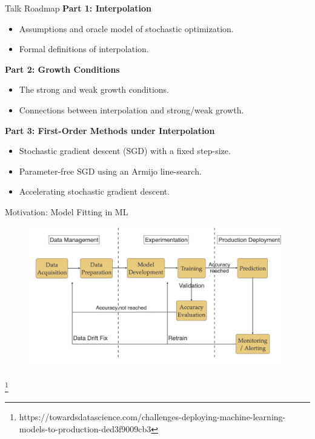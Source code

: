 \documentclass[mathserif,notheorems, hyperref={colorlinks, urlcolor=blue, linkcolor=blue}]{beamer}
\newcommand{\source}[1]{{\let\thefootnote\relax\footnote{{\tiny #1}}}}
\begin{document}
    \begin{frame}{Talk Roadmap}
        \textbf{Part 1: Interpolation}
        \begin{itemize}
            \item Assumptions and oracle model of stochastic optimization.
            \item Formal definitions of interpolation.
        \end{itemize}

        \vspace{2ex}
        
        \textbf{Part 2: Growth Conditions}
        \begin{itemize}
            \item The strong and weak growth conditions. 
            \item Connections between interpolation and strong/weak growth.
        \end{itemize}
        
        \vspace{2ex}

        \textbf{Part 3: First-Order Methods under Interpolation}
        \begin{itemize}
            \item Stochastic gradient descent (SGD) with a fixed step-size.
            \item Parameter-free SGD using an Armijo line-search.
            \item Accelerating stochastic gradient descent. 
        \end{itemize}
    \end{frame}

    \begin{frame}{Motivation: Model Fitting in ML}
       
       \begin{figure}
            \centering
            \includegraphics[width=0.98\textwidth]{figures/workflow} 
       \end{figure} 

       \source{https://towardsdatascience.com/challenges-deploying-machine-learning-models-to-production-ded3f9009cb3}
    \end{frame}
\end{document}
